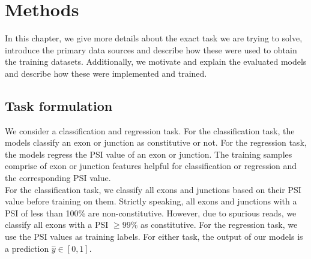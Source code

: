\chapter{\label{ch:4-methods}Methods} %




In this chapter, we give more details about the exact task we are trying to solve, introduce the primary data sources and describe how these were used to obtain the training datasets. Additionally, we motivate and explain the evaluated models and describe how these were implemented and trained.

%
%
%


\section{Task formulation} \label{sec:task_formulation}


We consider a classification and regression task. For the classification task, the models classify an exon or junction as constitutive or not. For the regression task, the models regress the PSI value of an exon or junction. The training samples comprise of exon or junction features helpful for classification or regression and the corresponding PSI value. \\
For the classification task, we classify all exons and junctions based on their PSI value before training on them. Strictly speaking, all exons and junctions with a PSI of less than 100\% are non-constitutive. However, due to spurious reads, we classify all exons with a PSI $\geq 99\%$ as constitutive. For the regression task, we use the PSI values as training labels. 
For either task, the output of our models is a prediction $\hat{y} \in [0, 1]$. 

